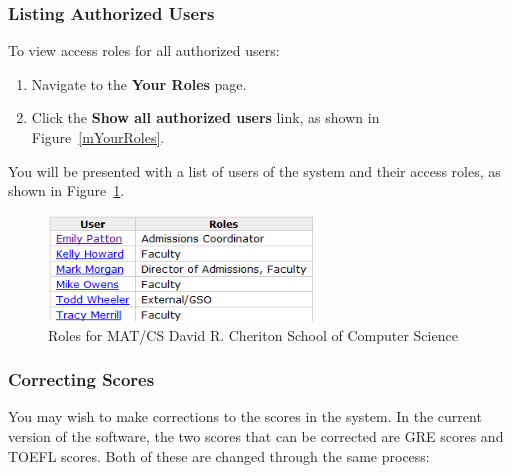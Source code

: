 \documentclass[titlepage]{article}
\begin{document}
\subsubsection{Listing Authorized Users}
To view access roles for all authorized users:
\begin{enumerate}
\item Navigate to the \textbf{\textsf{Your Roles}} page.
\item Click the \textbf{\textsf{Show all authorized users}} link, as shown in Figure~\ref{mYourRoles}.
\end{enumerate}

You will be presented with a list of users of the system and their access roles, as shown in Figure~\ref{nroles}.

\begin{figure}[h!]
  \begin{center}
    \includegraphics[width=7cm]{nroles.png}
  \end{center}
  \caption{Roles for MAT/CS David R. Cheriton School of Computer Science}
  \label{nroles}
\end{figure}

\subsubsection{Correcting Scores}

You may wish to make corrections to the scores in the system. In the current version of the software, the two scores that can be corrected are GRE scores and TOEFL scores. Both of these are changed through the same process:
\end{document}
